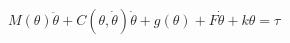 \documentclass{article}
\begin{document}
	
\[
M(\theta)\ddot{\theta} + C(\theta,\dot{\theta})\dot{\theta}+g(\theta)+F\dot{\theta}+k\theta=\tau 
\]
\end{document}
